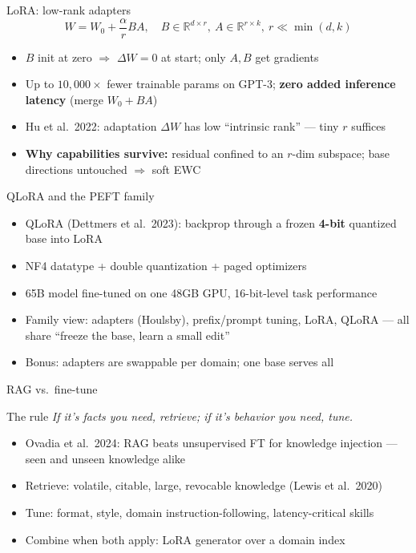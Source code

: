 \documentclass[aspectratio=169,11pt]{beamer}
\begin{document}
\begin{frame}{LoRA: low-rank adapters}
\[
W = W_0 + \frac{\alpha}{r} BA, \quad B \in \mathbb{R}^{d \times r},\ A \in \mathbb{R}^{r \times k},\ r \ll \min(d,k)
\]
\begin{itemize}
\item $B$ init at zero $\Rightarrow$ $\Delta W = 0$ at start; only $A, B$ get gradients
\item Up to $10{,}000\times$ fewer trainable params on GPT-3; \textbf{zero added inference latency} (merge $W_0 + BA$)
\item Hu et al.\ 2022: adaptation $\Delta W$ has low ``intrinsic rank'' --- tiny $r$ suffices
\item \textbf{Why capabilities survive:} residual confined to an $r$-dim subspace; base directions untouched $\Rightarrow$ soft EWC
\end{itemize}
\end{frame}

\begin{frame}{QLoRA and the PEFT family}
\begin{itemize}
\item QLoRA (Dettmers et al.\ 2023): backprop through a frozen \textbf{4-bit} quantized base into LoRA
\item NF4 datatype + double quantization + paged optimizers
\item 65B model fine-tuned on one 48GB GPU, 16-bit-level task performance
\item Family view: adapters (Houlsby), prefix/prompt tuning, LoRA, QLoRA --- all share ``freeze the base, learn a small edit''
\item Bonus: adapters are swappable per domain; one base serves all
\end{itemize}
\end{frame}

\begin{frame}{RAG vs.\ fine-tune}
\begin{block}{The rule}
\emph{If it's facts you need, retrieve; if it's behavior you need, tune.}
\end{block}
\begin{itemize}
\item Ovadia et al.\ 2024: RAG beats unsupervised FT for knowledge injection --- seen and unseen knowledge alike
\item Retrieve: volatile, citable, large, revocable knowledge (Lewis et al.\ 2020)
\item Tune: format, style, domain instruction-following, latency-critical skills
\item Combine when both apply: LoRA generator over a domain index
\end{itemize}
\end{frame}
\end{document}
